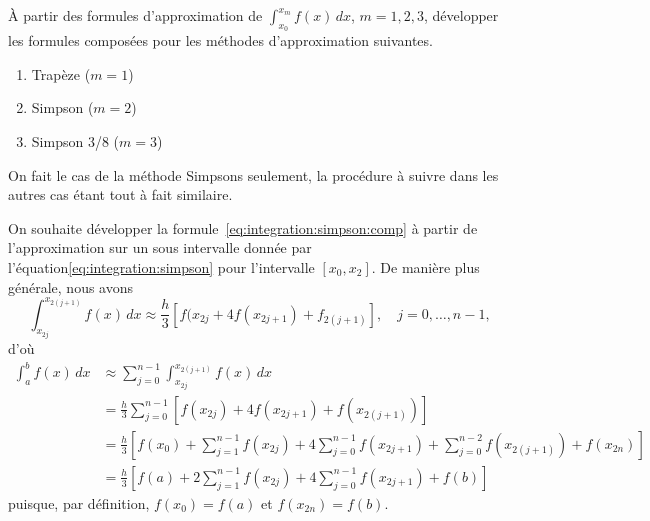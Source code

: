 \begin{exercice}
  À partir des formules d'approximation de $\int_{x_0}^{x_m} f(x)\,
  dx$, $m = 1, 2, 3$, développer les formules composées pour les
  méthodes d'approximation suivantes.
  \begin{enumerate}
  \item Trapèze ($m = 1$)
  \item Simpson ($m = 2$)
  \item Simpson 3/8 ($m = 3$)
  \end{enumerate}
  \begin{sol}
    On fait le cas de la méthode Simpsons seulement, la procédure à
    suivre dans les autres cas étant tout à fait similaire.

    On souhaite développer la
    formule~\eqref{eq:integration:simpson:comp} à partir de
    l'approximation sur un sous intervalle donnée par
    l'équation\eqref{eq:integration:simpson} pour l'intervalle $[x_0,
    x_2]$. De manière plus générale, nous avons
    \begin{equation*}
      \int_{x_{2j}}^{x_{2(j + 1)}} f(x)\, dx \approx
      \frac{h}{3} [f(x_{2j} + 4 f(x_{2j + 1}) + f_{2(j + 1)}], \quad
      j = 0, \dots, n - 1,
    \end{equation*}
    d'où
    \begin{align*}
      \int_a^b f(x)\, dx
      &\approx \sum_{j = 0}^{n - 1}
      \int_{x_{2j}}^{x_{2(j + 1)}} f(x)\, dx \\
      &= \frac{h}{3} \sum_{j = 0}^{n - 1}
      [f(x_{2j}) + 4 f(x_{2j + 1}) + f(x_{2(j + 1)})] \\
      &= \frac{h}{3}
      \left[
        f(x_0) +
        \sum_{j = 1}^{n - 1} f(x_{2j}) +
        4 \sum_{j = 0}^{n - 1} f(x_{2j + 1}) +
        \sum_{j = 0}^{n - 2} f(x_{2(j + 1)}) +
        f(x_{2n})
      \right] \\
      &= \frac{h}{3}
      \left[
        f(a) +
        2 \sum_{j = 1}^{n - 1} f(x_{2j}) +
        4 \sum_{j = 0}^{n - 1} f(x_{2j + 1}) +
        f(b)
      \right]
    \end{align*}
    puisque, par définition, $f(x_0) = f(a)$ et $f(x_{2n}) = f(b)$.
  \end{sol}
\end{exercice}

